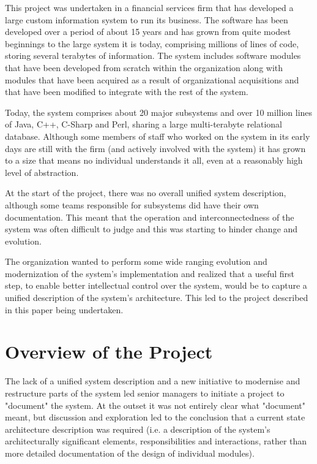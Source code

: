   This project was undertaken in a financial services firm that has developed a large custom information system to run its business.  The software has been developed over a period of about 15 years and has grown from quite modest beginnings to the large system it is today, comprising millions of lines of code, storing several terabytes of information.  The system includes software modules that have been developed from scratch within the organization along with modules that have been acquired as a result of organizational acquisitions and that have been modified to integrate with the rest of the system.

  Today, the system comprises about 20 major subsystems and over 10 million lines of Java, C++, C-Sharp and Perl, sharing a large multi-terabyte relational database.  Although some members of staff who worked on the system in its early days are still with the firm (and actively involved with the system) it has grown to a size that means no individual understands it all, even at a reasonably high level of abstraction.

  At the start of the project, there was no overall unified system description, although some teams responsible for subsystems did have their own documentation. This meant that the operation and interconnectedness of the system was often difficult to judge and this was starting to hinder change and evolution.

  The organization wanted to perform some wide ranging evolution and modernization of the system's implementation and realized that a useful first step, to enable better intellectual control over the system, would be to capture a unified description of the system's architecture.  This led to the project described in this paper being undertaken.

\section{Overview of the Project}

  The lack of a unified system description and a new initiative to modernise and restructure parts of the system led senior managers to initiate a project to "document" the system.  At the outset it was not entirely clear what "document" meant, but discussion and exploration led to the conclusion that a current state architecture description was required (i.e. a description of the system's architecturally significant elements, responsibilities and interactions, rather than more detailed documentation of the design of individual modules).


